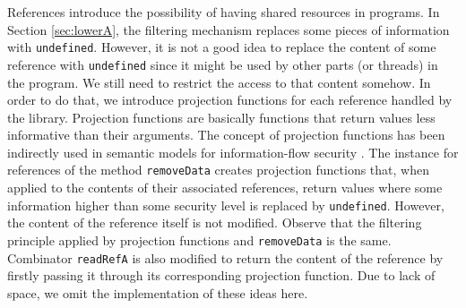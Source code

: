 \documentclass[times, 10pt,twocolumn]{article}
\begin{document}
{References introduce the possibility of having shared resources 
in programs. In Section \ref{sec:lowerA}, the filtering mechanism  
replaces some pieces of information with \texttt{undefined}. 
However, it is not a good idea to replace the content of some reference
with \texttt{undefined} since it might be used by other parts (or
threads) in the program. We still need to restrict the access 
to that content somehow. In order to do that, we introduce 
projection functions for each reference handled by the library. 
Projection functions are basically functions that return 
values less informative than their arguments. 
The concept of projection functions has been indirectly used in semantic
models for information-flow security \cite{Hun91b,Sabelfeld:Sands:ESOP99}. 
The instance for references of the method \texttt{removeData} 
creates projection functions that, when applied to the 
contents of their associated references, return values 
where some information higher than some 
security level is replaced by \texttt{undefined}. 
However, the content of the reference itself is not modified. 
Observe that 
the filtering principle applied by projection functions and 
\texttt{removeData} is the same. 
Combinator \texttt{readRefA} is 
also modified to return the content of the reference by 
firstly passing it through its corresponding projection function.
Due to lack of space, we omit the implementation of these
ideas here.






}
\end{document}

